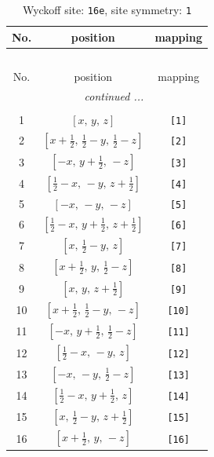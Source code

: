 \documentclass[fleqn,8pt]{jsarticle}
\begin{document}
\begin{longtable}{ccc}
\caption{Wyckoff site: {\tt 16e}, site symmetry: {\tt 1}}
 \\
 \hline \hline
No. & position & mapping \\ \hline \endfirsthead

\multicolumn{2}{l}{\tablename\ \thetable{}} \\
 \hline \hline
No. & position & mapping \\ \hline \endhead

 \hline \hline
\multicolumn{2}{r}{\footnotesize\it continued ...} \\ \endfoot

 \hline \hline
\multicolumn{2}{r}{} \\ \endlastfoot

1 & $\left[ x,\, y,\, z \right]$ & {\tt [1]} \\ \hline
2 & $\left[ x + \frac{1}{2},\, \frac{1}{2} - y,\, \frac{1}{2} - z \right]$ & {\tt [2]} \\ \hline
3 & $\left[ - x,\, y + \frac{1}{2},\, - z \right]$ & {\tt [3]} \\ \hline
4 & $\left[ \frac{1}{2} - x,\, - y,\, z + \frac{1}{2} \right]$ & {\tt [4]} \\ \hline
5 & $\left[ - x,\, - y,\, - z \right]$ & {\tt [5]} \\ \hline
6 & $\left[ \frac{1}{2} - x,\, y + \frac{1}{2},\, z + \frac{1}{2} \right]$ & {\tt [6]} \\ \hline
7 & $\left[ x,\, \frac{1}{2} - y,\, z \right]$ & {\tt [7]} \\ \hline
8 & $\left[ x + \frac{1}{2},\, y,\, \frac{1}{2} - z \right]$ & {\tt [8]} \\ \hline
9 & $\left[ x,\, y,\, z + \frac{1}{2} \right]$ & {\tt [9]} \\ \hline
10 & $\left[ x + \frac{1}{2},\, \frac{1}{2} - y,\, - z \right]$ & {\tt [10]} \\ \hline
11 & $\left[ - x,\, y + \frac{1}{2},\, \frac{1}{2} - z \right]$ & {\tt [11]} \\ \hline
12 & $\left[ \frac{1}{2} - x,\, - y,\, z \right]$ & {\tt [12]} \\ \hline
13 & $\left[ - x,\, - y,\, \frac{1}{2} - z \right]$ & {\tt [13]} \\ \hline
14 & $\left[ \frac{1}{2} - x,\, y + \frac{1}{2},\, z \right]$ & {\tt [14]} \\ \hline
15 & $\left[ x,\, \frac{1}{2} - y,\, z + \frac{1}{2} \right]$ & {\tt [15]} \\ \hline
16 & $\left[ x + \frac{1}{2},\, y,\, - z \right]$ & {\tt [16]} \\
\end{longtable}
\end{document}
